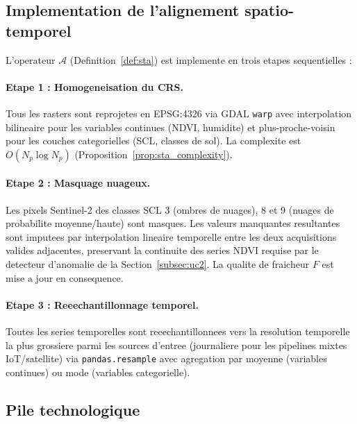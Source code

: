 \documentclass[12pt,a4paper]{article}
\theoremstyle{plain}
\theoremstyle{definition}
\theoremstyle{remark}
\begin{document}
	\subsection{Implementation de l'alignement spatio-temporel}
	\label{subsec:alignment_impl}
	
	L'operateur $\mathcal{A}$ (Definition~\ref{def:sta}) est implemente
	en trois etapes sequentielles :
	
	\paragraph{Etape 1 : Homogeneisation du CRS.}
	Tous les rasters sont reprojetes en EPSG:4326 via GDAL \texttt{warp}
	avec interpolation bilineaire pour les variables continues (NDVI, humidite)
	et plus-proche-voisin pour les couches categorielles (SCL, classes de sol).
	La complexite est $O(N_p \log N_p)$
	(Proposition~\ref{prop:sta_complexity}).
	
	\paragraph{Etape 2 : Masquage nuageux.}
	Les pixels Sentinel-2 des classes SCL 3 (ombres de nuages), 8 et 9
	(nuages de probabilite moyenne/haute) sont masques. Les valeurs
	manquantes resultantes sont imputees par interpolation lineaire
	temporelle entre les deux acquisitions valides adjacentes, preservant
	la continuite des series NDVI requise par le detecteur d'anomalie
	de la Section~\ref{subsec:uc2}. La qualite de fraicheur $F$ est
	mise a jour en consequence.
	
	\paragraph{Etape 3 : Reeechantillonnage temporel.}
	Toutes les series temporelles sont reeechantillonnees vers la
	resolution temporelle la plus grossiere parmi les sources d'entree
	(journaliere pour les pipelines mixtes IoT/satellite) via
	\texttt{pandas.resample} avec agregation par moyenne (variables continues)
	ou mode (variables categorielle).
	
	\subsection{Pile technologique}
	
\end{document}
